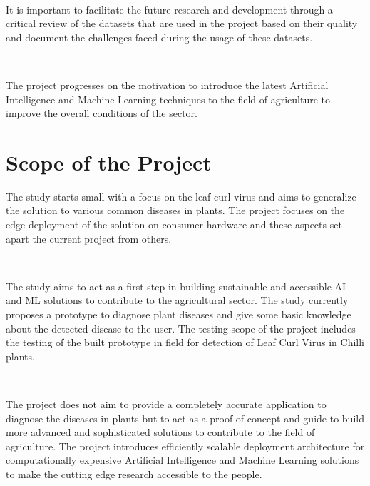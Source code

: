 \

It is important to facilitate the future research and development through a critical review of the datasets that are used in the project based on their quality and document the challenges faced during the usage of these datasets. 

\

The project progresses on the motivation to introduce the latest Artificial Intelligence and Machine Learning techniques to the field of agriculture to improve the overall conditions of the sector.

\section{Scope of the Project}   
The study starts small with a focus on the leaf curl virus and aims to generalize the solution to various common diseases in plants. The project focuses on the edge deployment of the solution on consumer hardware and these aspects set apart the current project from others.

\

The study aims to act as a first step in building sustainable and accessible AI and ML solutions to contribute to the agricultural sector. The study currently proposes a prototype to diagnose plant diseases and give some basic knowledge about the detected disease to the user. The testing scope of the project includes the testing of the built prototype in field for detection of Leaf Curl Virus in Chilli plants. 

\

The project does not aim to provide a completely accurate application to diagnose the diseases in plants but to act as a proof of concept and guide to build more advanced and sophisticated solutions to contribute to the field of agriculture. The project introduces efficiently scalable deployment architecture for computationally expensive Artificial Intelligence and Machine Learning solutions to make the cutting edge research accessible to the people.


